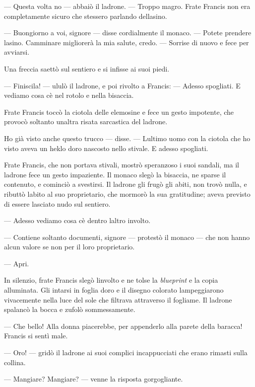 --- Questa volta no --- abbaiò il ladrone. --- Troppo magro. Frate
Francis non era completamente sicuro che stessero parlando
dell\textquotesingle asino.

--- Buongiorno a voi, signore --- disse cordialmente il monaco. ---
Potete prendere l\textquotesingle asino. Camminare migliorerà la mia
salute, credo. --- Sorrise di nuovo e fece per avviarsi.

Una freccia saettò sul sentiero e si infisse ai suoi piedi.

--- Finiscila! --- ululò il ladrone, e poi rivolto a Francis: --- Adesso
spogliati. E vediamo cosa c\textquotesingle è nel rotolo e nella
bisaccia.

Frate Francis toccò la ciotola delle elemosine e fece un gesto
impotente, che provocò soltanto un\textquotesingle altra risata
sarcastica del ladrone.

Ho già visto anche questo trucco --- disse. --- L\textquotesingle ultimo
uomo con la ciotola che ho visto aveva un heklo d\textquotesingle oro
nascosto nello stivale. E adesso spogliati.

Frate Francis, che non portava stivali, mostrò speranzoso i suoi
sandali, ma il ladrone fece un gesto impaziente. Il monaco slegò la
bisaccia, ne sparse il contenuto, e cominciò a svestirsi. Il ladrone gli
frugò gli abiti, non trovò nulla, e ributtò l\textquotesingle abito al
suo proprietario, che mormorò la sua gratitudine; aveva previsto di
essere lasciato nudo sul sentiero.

--- Adesso vediamo cosa c\textquotesingle è dentro
l\textquotesingle altro involto.

--- Contiene soltanto documenti, signore --- protestò il monaco --- che
non hanno alcun valore se non per il loro proprietario.

--- Apri.

In silenzio, frate Francis slegò l\textquotesingle involto e ne tolse la
\emph{blueprint} e la copia alluminata. Gli intarsi in foglia
d\textquotesingle oro e il disegno colorato lampeggiarono vivacemente
nella luce del sole che filtrava attraverso il fogliame. Il ladrone
spalancò la bocca e zufolò sommessamente.

--- Che bello! Alla donna piacerebbe, per appenderlo alla parete della
baracca! Francis si sentì male.

--- Oro! --- gridò il ladrone ai suoi complici incappucciati che erano
rimasti sulla collina.

--- Mangiare? Mangiare? --- venne la risposta gorgogliante.

